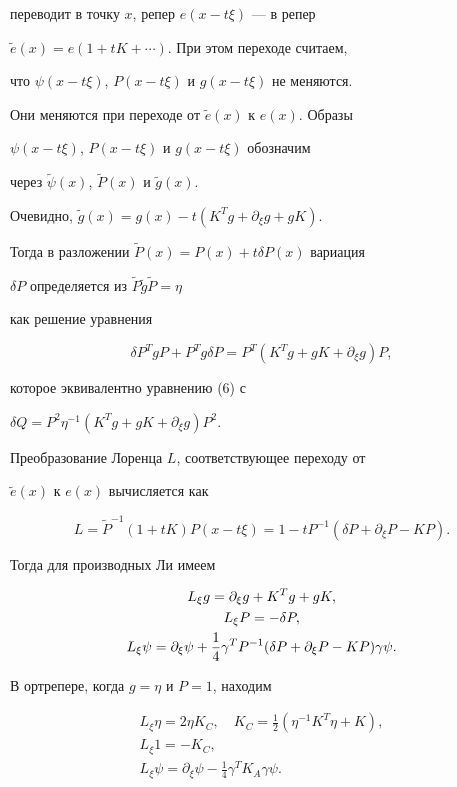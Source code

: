 переводит в точку $x$, репер $e(x-t\xi)$ --- в репер


$\widetilde e (x)=e(1+tK+\dotsb)$. При этом переходе считаем,


что $\psi (x-t\xi)$, $P(x-t\xi)$ и $g(x-t\xi)$ не меняются.


Они меняются при переходе от $\widetilde e(x)$ к $e(x)$. Образы


$\psi (x-t\xi)$, $P(x-t\xi)$ и $g(x-t\xi)$ обозначим


через $\widetilde \psi (x)$, $\widetilde P (x)$ и $\widetilde g(x)$.


Очевидно, $\widetilde g(x)=g(x)-t(K^T g+\partial_\xi g+gK)$.


Тогда в разложении $\widetilde P(x)=P(x)+t\delta P(x)$ вариация


$\delta P$ определяется из $\widetilde P \widetilde g \widetilde P=\eta$


как решение уравнения


$$


\delta P^TgP+P^Tg\delta P=P^T(K^Tg+gK+\partial_\xi g)P,


$$


которое эквивалентно уравнению (6) с


$\delta Q=P^2\eta^{-1}(K^Tg+gK+\partial_\xi g )P^2$.


Преобразование Лоренца $L$, соответствующее переходу от


$\widetilde e(x)$ к $e(x)$ вычисляется как


$$


L=\widetilde P^{-1}(1+tK)P(x-t\xi)=1-tP^{-1}(\delta P+


\partial_\xi P-KP).


$$


Тогда для производных Ли имеем


\begin{gather}


L_\xi g=\partial _\xi g+K^Tg+gK, \notag \\


L_\xi P=-\delta P, \\


L_\xi\psi=\partial_\xi \psi+\frac{1}{4}\gamma^TP^{-1}


(\delta P+\partial_\xi P-KP)\gamma\psi. \notag


\end{gather}


В ортрепере, когда $g=\eta$ и $P=1$, находим


\begin{gather*}


L_\xi\eta=2\eta K_C,\quad K_C=\frac{1}{2}(\eta^{-1}K^T\eta +K),\\


L_\xi 1=-K_C, \\


L_\xi\psi=\partial_\xi \psi-\frac{1}{4}\gamma^T K_A\gamma\psi.


\end{gather*}


